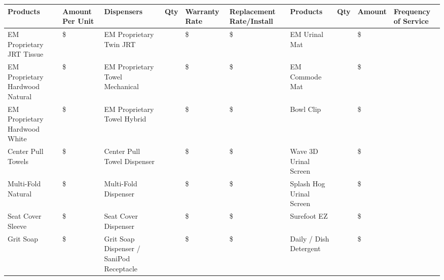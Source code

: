 \documentclass[10pt]{article}
\begin{document}
\noindent
\begin{tabularx}{0.98\textwidth}{|
    Y | C{1.4cm} | Y | C{0.9cm} | C{1.6cm} | C{2.0cm} |
    Y | C{0.9cm} | C{1.4cm} | Y |}
  \hline
  \textbf{\textcolor{emred}{Products}} &
  \textbf{\textcolor{emred}{Amount Per Unit}} &
  \textbf{\textcolor{emred}{Dispensers}} &
  \textbf{\textcolor{emred}{Qty}} &
  \textbf{\textcolor{emred}{Warranty Rate}} &
  \textbf{\textcolor{emred}{Replacement Rate/Install}} &
  \textbf{\textcolor{emred}{Products}} &
  \textbf{\textcolor{emred}{Qty}} &
  \textbf{\textcolor{emred}{Amount}} &
  \textbf{\textcolor{emred}{Frequency of Service}} \\
  \hline

  EM Proprietary JRT Tissue &
  \$ &
  EM Proprietary Twin JRT &
  &
  \$ &
  \$ &
  EM Urinal Mat &
  &
  \$ &
  \\ \hline

  EM Proprietary Hardwood Natural &
  \$ &
  EM Proprietary Towel Mechanical &
  &
  \$ &
  \$ &
  EM Commode Mat &
  &
  \$ &
  \\ \hline

  EM Proprietary Hardwood White &
  \$ &
  EM Proprietary Towel Hybrid &
  &
  \$ &
  \$ &
  Bowl Clip &
  &
  \$ &
  \\ \hline

  Center Pull Towels &
  \$ &
  Center Pull Towel Dispenser &
  &
  \$ &
  \$ &
  Wave 3D Urinal Screen &
  &
  \$ &
  \\ \hline

  Multi-Fold Natural &
  \$ &
  Multi-Fold Dispenser &
  &
  \$ &
  \$ &
  Splash Hog Urinal Screen &
  &
  \$ &
  \\ \hline

  Seat Cover Sleeve &
  \$ &
  Seat Cover Dispenser &
  &
  \$ &
  \$ &
  Surefoot EZ &
  &
  \$ &
  \\ \hline

  Grit Soap &
  \$ &
  Grit Soap Dispenser / SaniPod Receptacle &
  &
  \$ &
  \$ &
  Daily / Dish Detergent &
  &
  \$ &
  \\ \hline

\end{tabularx}


\vspace{1.0em}

\noindent
{}
\end{document}
